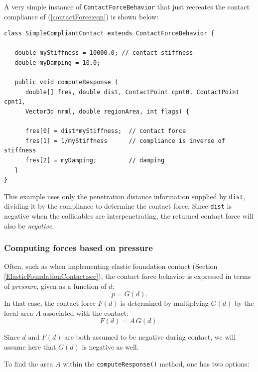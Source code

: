 A very simple instance of {\tt ContactForceBehavior} that just
recreates the contact compliance of (\ref{contactForce:eqn})
is shown below:
%
\begin{lstlisting}[]
class SimpleCompliantContact extends ContactForceBehavior {

   double myStiffness = 10000.0; // contact stiffness
   double myDamping = 10.0;

   public void computeResponse (
      double[] fres, double dist, ContactPoint cpnt0, ContactPoint cpnt1, 
      Vector3d nrml, double regionArea, int flags) {

      fres[0] = dist*myStiffness;  // contact force
      fres[1] = 1/myStiffness      // compliance is inverse of stiffness
      fres[2] = myDamping;         // damping
   }
}
\end{lstlisting}
%
This example uses only the penetration distance information supplied
by {\tt dist}, dividing it by the compliance to determine the contact
force. Since {\tt dist} is negative when the collidables are
interpenetrating, the returned contact force will also be {\it
negative}.

\subsubsection{Computing forces based on pressure}
\label{pressureBasedContact:sec}

Often, such as when implementing elastic foundation contact
(Section \ref{ElasticFoundationContact:sec}), the contact force
behavior is expressed in terms of {\it pressure}, given as a
function of $d$:
%
\begin{equation}
p = G (d).
\end{equation}
%
In that case, the contact force $F(d)$ is determined by multiplying
$G(d)$ by the local area $A$ associated with the contact:
%
\begin{equation}
F(d) = A \, G(d).
\end{equation}
%
\begin{sideblock}
Since $d$ and $F(d)$ are both assumed to be negative during contact,
we will assume here that $G(d)$ is negative as well.
\end{sideblock}

To find the area $A$ within the {\tt computeResponse()} method, one
has two options:

